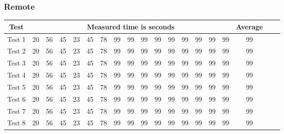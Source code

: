 \subsubsection{Remote}
\begin{center}
    \begin{tabular}{| c | c | c | c | c | c | c | c | c | c | c | c | c | c | c | c | c | c | c |}
    \hline
    Test & \multicolumn{15}{|c|}{Measured time is seconds} & Average \\ \hline
    Test 1 & 20 & 56 & 45 & 23 & 45 & 78 & 99 & 99 & 99 & 99 & 99 & 99 & 99 & 99 & 99 & 99 \\ \hline
    Test 2 & 20 & 56 & 45 & 23 & 45 & 78 & 99 & 99 & 99 & 99 & 99 & 99 & 99 & 99 & 99 & 99 \\ \hline
    Test 3 & 20 & 56 & 45 & 23 & 45 & 78 & 99 & 99 & 99 & 99 & 99 & 99 & 99 & 99 & 99 & 99 \\ \hline
    Test 4 & 20 & 56 & 45 & 23 & 45 & 78 & 99 & 99 & 99 & 99 & 99 & 99 & 99 & 99 & 99 & 99 \\ \hline
    Test 5 & 20 & 56 & 45 & 23 & 45 & 78 & 99 & 99 & 99 & 99 & 99 & 99 & 99 & 99 & 99 & 99 \\ \hline
    Test 6 & 20 & 56 & 45 & 23 & 45 & 78 & 99 & 99 & 99 & 99 & 99 & 99 & 99 & 99 & 99 & 99 \\ \hline
    Test 7 & 20 & 56 & 45 & 23 & 45 & 78 & 99 & 99 & 99 & 99 & 99 & 99 & 99 & 99 & 99 & 99 \\ \hline
    Test 8 & 20 & 56 & 45 & 23 & 45 & 78 & 99 & 99 & 99 & 99 & 99 & 99 & 99 & 99 & 99 & 99 \\ \hline
    \end{tabular}
\end{center}